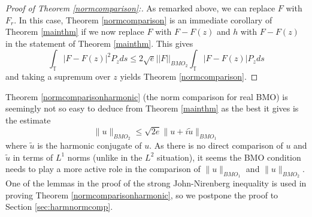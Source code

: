 \documentclass[12pt]{amsart}
\theoremstyle{definition}
\theoremstyle{remark}
\numberwithin{equation}{section}
\newcommand{\D}{\mathbb{D}}
\newcommand{\T}{\mathbb{T}}
\begin{document}


\begin{proof}[Proof of Theorem \ref{normcomparison}:]
As remarked above, we can replace $F$ with $F_r$.  In this case,
Theorem \ref{normcomparison} is an immediate corollary of Theorem
\ref{mainthm} if we now replace $F$ with $F-F(z)$ and $h$ with
$F-F(z)$ in the statement of Theorem \ref{mainthm}. This gives
\[
\int_{\T} |F - F(z)|^2 P_zds \leq 2\sqrt{e} ||F||_{BMO_2} \int_{\T}
|F-F(z)| P_z ds
 \]
and taking a supremum over $z$ yields Theorem \ref{normcomparison}.
\end{proof}

Theorem \ref{normcomparisonharmonic} (the norm comparison for real
BMO) is seemingly not so easy to deduce from Theorem \ref{mainthm} as
the best it gives is the estimate
\[
\|u\|_{BMO_2} \leq \sqrt{2e} \|u+i\tilde{u}\|_{BMO_1}
\]
where $\tilde{u}$ is the harmonic conjugate of $u$.  As there is no
direct comparison of $u$ and $\tilde{u}$ in terms of $L^1$ norms
(unlike in the $L^2$ situation), it seems the BMO condition needs to
play a more active role in the comparison of $\|u\|_{BMO_1}$ and
$\|u\|_{BMO_2}$.  One of the lemmas in the proof of the strong
John-Nirenberg inequality is used in proving Theorem
\ref{normcomparisonharmonic}, so we postpone the proof to Section
\ref{sec:harmnormcomp}.
\end{document}
